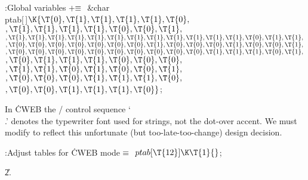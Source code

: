 \Y\B\4:Global variables\X${}\mathrel+\equiv{}$\6
\&{char} \\{ptab}[\,]${}\K\{\T{0},\39\T{1},\39\T{1},\39\T{1},\39\T{1},\39%
\T{0},{}$\6
${},\39\T{1},\39\T{1},\39\T{1},\39\T{1},\39\T{0},\39\T{0},\39\T{1},{}$\6
${},\39\T{1},\39\T{1},\39\T{1},\39\T{1},\39\T{1},\39\T{1},\39\T{1},\39%
\T{1},\39\T{1},\39\T{1},\39\T{1},\39\T{1},\39\T{0},\39\T{1},\39\T{1},{}$\C{ \.{%
\\=} }\6
${},\39\T{0},\39\T{0},\39\T{0},\39\T{0},\39\T{0},\39\T{0},\39\T{0},\39%
\T{1},\39\T{0},\39\T{0},\39\T{0},\39\T{1},\39\T{0},\39\T{0},\39\T{1},{}$\C{ \.{%
\\H}, \.{\\L}, \.{\\O} }\6
${},\39\T{0},\39\T{0},\39\T{0},\39\T{0},\39\T{0},\39\T{0},\39\T{0},\39%
\T{0},\39\T{0},\39\T{0},\39\T{1},\39\T{1},\39\T{1},\39\T{0},\39\T{1},{}$\C{ \.{%
\\\^} }\6
${},\39\T{0},\39\T{1},\39\T{1},\39\T{1},\39\T{0},\39\T{0},\39\T{0},{}$\6
${},\39\T{1},\39\T{1},\39\T{0},\39\T{1},\39\T{0},\39\T{0},\39\T{1},{}$\C{ %
\.{\\i}, \.{\\j}, \.{\\l}, \.{\\o} }\6
${},\39\T{0},\39\T{0},\39\T{0},\39\T{1},\39\T{1},\39\T{1},\39\T{0},{}$\C{ %
\.{\\t}, \.{\\u}, \.{\\v} }\6
${},\39\T{0},\39\T{0},\39\T{1},\39\T{1},\39\T{1},\39\T{0}\}{}$;\C{ \.{%
\\\~} }\par
\fi

In \.{CWEB} the \TEX/ control sequence `\.{\\.}' denotes the typewriter
font used for strings, not the dot-over accent. We must modify
 to reflect this unfortunate (but too-late-too-change) design
decision.

\Y\B\4:Adjust tables for \.{CWEB} mode\X${}\equiv{}$\6
$\\{ptab}[\T{12}]\K\T{1}{}$;\par
\U2.\fi

